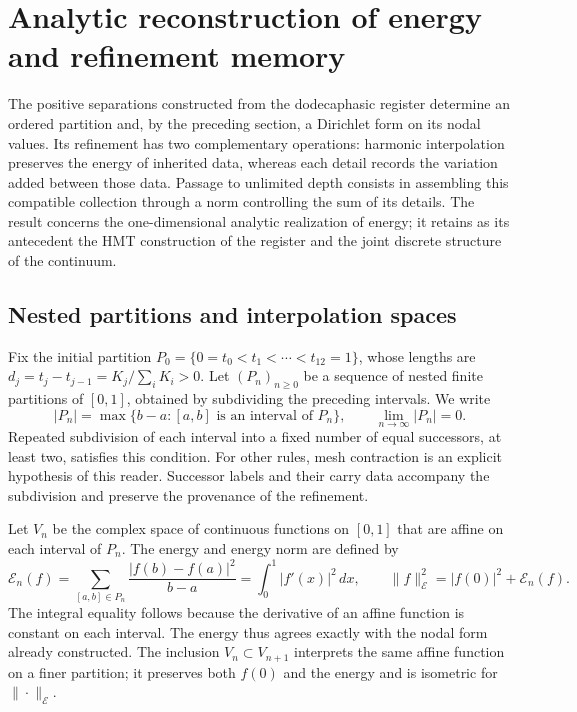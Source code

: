 \section{Analytic reconstruction of energy and refinement memory}
\label{sec:limite-energetico-k}

The positive separations constructed from the dodecaphasic register
determine an ordered partition and, by the preceding section, a
Dirichlet form on its nodal values. Its refinement has two complementary
operations: harmonic interpolation preserves the energy of inherited
data, whereas each detail records the variation added between those
data. Passage to unlimited depth consists in assembling this compatible
collection through a norm controlling the sum of its details. The result
concerns the one-dimensional analytic realization of energy; it retains
as its antecedent the HMT construction of the register and the joint
discrete structure of the continuum.

\subsection{Nested partitions and interpolation spaces}

Fix the initial partition
\(P_0=\{0=t_0<t_1<\cdots<t_{12}=1\}\), whose lengths are
\(d_j=t_j-t_{j-1}=K_j/\sum_iK_i>0\). Let
\((P_n)_{n\geq0}\) be a sequence of nested finite partitions of
\([0,1]\), obtained by subdividing the preceding intervals.
We write
\[
 |P_n|=\max\{b-a:[a,b]\text{ is an interval of }P_n\},
 \qquad \lim_{n\to\infty}|P_n|=0.
\]
Repeated subdivision of each interval into a fixed number of equal
successors, at least two, satisfies this condition. For other rules,
mesh contraction is an explicit hypothesis of this reader.
Successor labels and their carry data accompany the subdivision and
preserve the provenance of the refinement.

Let \(V_n\) be the complex space of continuous functions on \([0,1]\)
that are affine on each interval of \(P_n\). The energy and energy
norm are defined by
\begin{equation}
 \mathcal E_n(f)
 =\sum_{[a,b]\in P_n}\frac{|f(b)-f(a)|^2}{b-a}
 =\int_0^1|f'(x)|^2\,dx,
 \qquad
 \|f\|_{\mathcal E}^2=|f(0)|^2+\mathcal E_n(f).
 \label{eq:energia-afines-k}
\end{equation}
The integral equality follows because the derivative of an affine
function is constant on each interval. The energy thus agrees exactly
with the nodal form already constructed. The inclusion
\(V_n\subset V_{n+1}\) interprets the same affine function on a
finer partition; it preserves both \(f(0)\) and the energy and is
isometric for \(\|\cdot\|_{\mathcal E}\).

